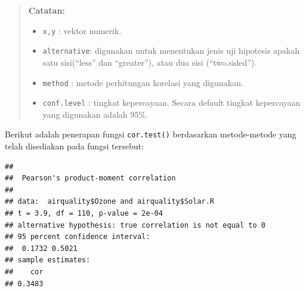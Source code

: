 \documentclass[]{book}
\newenvironment{Shaded}{\begin{snugshade}}{\end{snugshade}}
\newcommand{\CommentTok}[1]{\textcolor[rgb]{0.56,0.35,0.01}{\textit{#1}}}
\newcommand{\DataTypeTok}[1]{\textcolor[rgb]{0.13,0.29,0.53}{#1}}
\newcommand{\KeywordTok}[1]{\textcolor[rgb]{0.13,0.29,0.53}{\textbf{#1}}}
\newcommand{\NormalTok}[1]{#1}
\newcommand{\OperatorTok}[1]{\textcolor[rgb]{0.81,0.36,0.00}{\textbf{#1}}}
\newcommand{\StringTok}[1]{\textcolor[rgb]{0.31,0.60,0.02}{#1}}
\providecommand{\tightlist}{%
  \setlength{\itemsep}{0pt}\setlength{\parskip}{0pt}}
\theoremstyle{definition}
\theoremstyle{definition}
\theoremstyle{definition}
\theoremstyle{remark}
\begin{document}
\begin{quote}
\textbf{Catatan:}

\begin{itemize}
\tightlist
\item
  \texttt{x,y} : vektor numerik.
\item
  \texttt{alternative}: digunakan untuk menentukan jenis uji hipotesis apakah satu sisi(``less'' dan ``greater''), atau dua sisi (``two.sided'').
\item
  \texttt{method} : metode perhitungan korelasi yang digunakan.
\item
  \texttt{conf.level} : tingkat kepercayaan. Secara default tingkat kepercayaan yang digunakan adalah 95\%.
\end{itemize}
\end{quote}

Berikut adalah penerapan fungsi \texttt{cor.test()} berdasarkan metode-metode yang telah disediakan pada fungsi tersebut:

\begin{Shaded}
\end{Shaded}

\begin{verbatim}
## 
##  Pearson's product-moment correlation
## 
## data:  airquality$Ozone and airquality$Solar.R
## t = 3.9, df = 110, p-value = 2e-04
## alternative hypothesis: true correlation is not equal to 0
## 95 percent confidence interval:
##  0.1732 0.5021
## sample estimates:
##    cor 
## 0.3483
\end{verbatim}

\begin{Shaded}
\end{Shaded}
\end{document}
